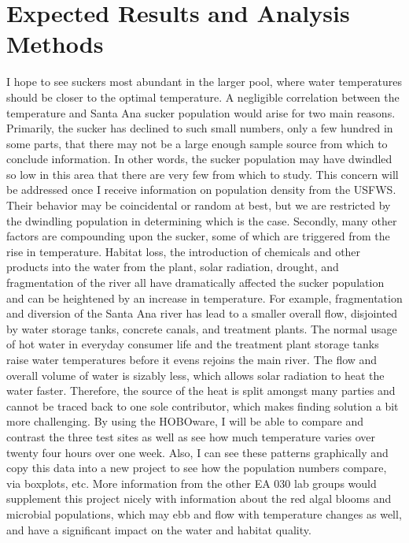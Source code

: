 \documentclass{tufte-handout}
\begin{document}
\section{Expected Results and Analysis Methods} I hope to see suckers most abundant in the larger pool, where water temperatures should be closer to the optimal temperature. A negligible correlation between the temperature and Santa Ana sucker population would arise for two main reasons. Primarily, the sucker has declined to such small numbers, only a few hundred in some parts, that there may not be a large enough sample source from which to conclude information. In other words, the sucker population may have dwindled so low in this area that there are very few from which to study. This concern will be addressed once I receive information on population density from the USFWS. Their behavior may be coincidental or random at best, but we are restricted by the dwindling population in determining which is the case. Secondly, many other factors are compounding upon the sucker, some of which are triggered from the rise in temperature. Habitat loss, the introduction of chemicals and other products into the water from the plant, solar radiation, drought, and fragmentation of the river all have dramatically affected the sucker population and can be heightened by an increase in temperature. For example, fragmentation and diversion of the Santa Ana river has lead to a smaller overall flow, disjointed by water storage tanks, concrete canals, and treatment plants. The normal usage of hot water in everyday consumer life and the treatment plant storage tanks raise water temperatures before it evens rejoins the main river. The flow and overall volume of water is sizably less, which allows solar radiation to heat the water faster. Therefore, the source of the heat is split amongst many parties and cannot be traced back to one sole contributor, which makes finding solution a bit more challenging.
  By using the HOBOware, I will be able to compare and contrast the three test sites as well as see how much temperature varies over twenty four hours over one week. Also, I can see these patterns graphically and copy this data into a new project to see how the population numbers compare, via boxplots, etc. More information from the other EA 030 lab groups would supplement this project nicely with information about the red algal blooms and microbial populations, which may ebb and flow with temperature changes as well, and have a significant impact on the water and habitat quality.
\end{document}

